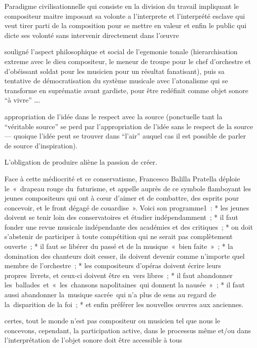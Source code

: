 Paradigme civilisationnelle qui consiste en la division du travail
impliquant le compositeur maitre imposant sa volonte a l’interprete
et l’interprété esclave qui veut tirer parti de la composition pour se mettre en valeur 
et enfin le public qui dicte ses volonté sans intervenir directement dans l’œuvre


souligné l’aspect philosophique et social de l’egemonie tonale (hierarchisation extreme avec le dieu compositeur, le meneur de troupe pour le chef d’orchestre et d’obéissant soldat pour les musicien pour un résultat fanatisant), puis sa tentative de démocratisation du système musicale avec l’atonalisme qui se transforme en suprématie avant gardiste, pour être redéfinit comme objet sonore “à vivre” ….


appropriation de l’idée dans le respect avec la source (ponctuelle tant la “véritable source” se perd par l’appropriation de l’idée sans le respect de la source — quoique l’idée peut se trouver dans “l’air” auquel cas il est possible de parler de source d’inspiration).


L’obligation de produire aliène la passion de créer. 

Face à cette médiocrité et ce conservatisme, Francesco Balilla Pratella déploie le « drapeau rouge du futurisme, et appelle auprès de ce symbole flamboyant les jeunes compositeurs qui ont à cœur d'aimer et de combattre, des esprits pour concevoir, et le front dégagé de couardise ».
Voici son programme1 :
* les jeunes doivent se tenir loin des conservatoires et étudier indépendamment ;
* il faut fonder une revue musicale indépendante des académies et des critiques ;
* on doit s'abstenir de participer à toute compétition qui ne serait pas complètement ouverte ;
* il faut se libérer du passé et de la musique « bien faite » ;
* la domination des chanteurs doit cesser, ils doivent devenir comme n'importe quel membre de l'orchestre ;
* les compositeurs d'opéras doivent écrire leurs propres livrets, et ceux-ci doivent être en vers libres ;
* il faut abandonner les ballades et « les chansons napolitaines qui donnent la nausée » ;
* il faut aussi abandonner la musique sacrée qui n'a plus de sens au regard de la disparition de la foi ;
* et enfin préférer les nouvelles œuvres aux anciennes.


certes, tout le monde n’est pas compositeur ou musicien tel que nous le concevons, cependant, la participation active, dans le processus même et/ou dans l’interprétation de l’objet sonore doit être accessible à tous 






